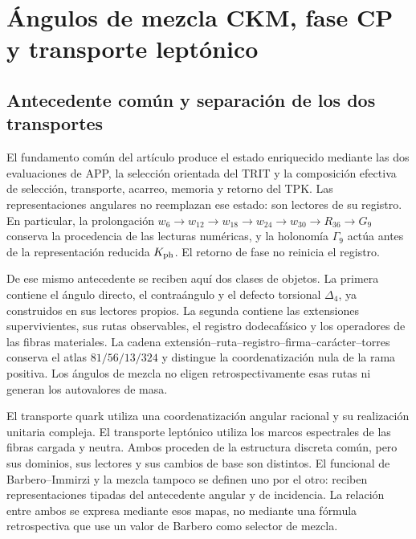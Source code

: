
\section{Ángulos de mezcla CKM, fase CP y transporte leptónico}
\label{sec:ii-propagacion-angular}

\subsection{Antecedente común y separación de los dos transportes}

El fundamento común del artículo produce el estado enriquecido mediante
las dos evaluaciones de APP, la selección orientada del TRIT y la
composición efectiva de selección, transporte, acarreo, memoria y retorno
del TPK. Las representaciones angulares no reemplazan ese estado: son lectores
de su registro. En particular, la prolongación
\(w_6\to w_{12}\to w_{18}\to w_{24}\to w_{30}\to R_{36}\to G_9\)
conserva la procedencia de las lecturas numéricas, y la holonomía
\(\Gamma_9\) actúa antes de la representación reducida \(K_{\rm ph}\).
El retorno de fase no reinicia el registro.

De ese mismo antecedente se reciben aquí dos clases de objetos. La primera
contiene el ángulo directo, el contraángulo y el defecto torsional
\(\Delta_4\), ya construidos en sus lectores propios. La segunda contiene
las extensiones supervivientes, sus rutas observables, el registro
dodecafásico y los operadores de las fibras materiales. La cadena
extensión--ruta--registro--firma--carácter--torres conserva el atlas
\(81/56/13/324\) y distingue la coordenatización nula de la rama positiva.
Los ángulos de mezcla no eligen retrospectivamente esas rutas ni generan
los autovalores de masa.

El transporte quark utiliza una coordenatización angular racional y su realización
unitaria compleja. El transporte leptónico utiliza los marcos espectrales
de las fibras cargada y neutra. Ambos proceden de la estructura discreta
común, pero sus dominios, sus lectores y sus cambios de base son distintos.
El funcional de Barbero--Immirzi y la mezcla tampoco se definen uno por el
otro: reciben representaciones tipadas del antecedente angular y de incidencia.
La relación entre ambos se expresa mediante esos mapas, no mediante una
fórmula retrospectiva que use un valor de Barbero como selector de mezcla.

